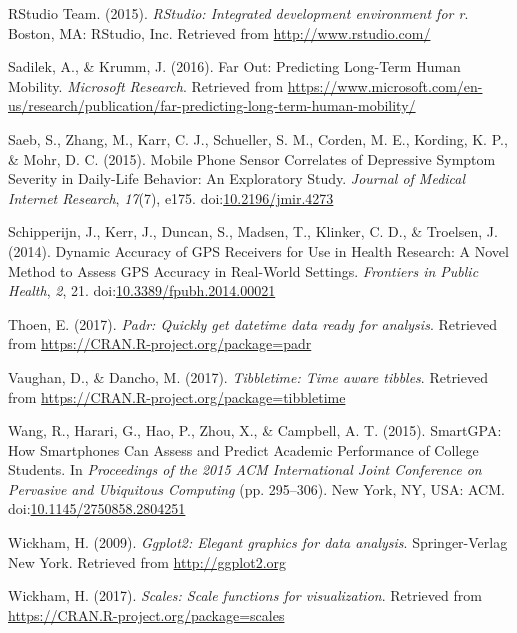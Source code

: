 \documentclass[english,man]{apa6}
\theoremstyle{definition}
\theoremstyle{definition}
\theoremstyle{definition}
\theoremstyle{remark}
\begin{document}
\hypertarget{ref-rstudio}{}
RStudio Team. (2015). \emph{RStudio: Integrated development environment
for r}. Boston, MA: RStudio, Inc. Retrieved from
\url{http://www.rstudio.com/}

\hypertarget{ref-sadilek_far_2016}{}
Sadilek, A., \& Krumm, J. (2016). Far Out: Predicting Long-Term Human
Mobility. \emph{Microsoft Research}. Retrieved from
\url{https://www.microsoft.com/en-us/research/publication/far-predicting-long-term-human-mobility/}

\hypertarget{ref-saeb_mobile_2015}{}
Saeb, S., Zhang, M., Karr, C. J., Schueller, S. M., Corden, M. E.,
Kording, K. P., \& Mohr, D. C. (2015). Mobile Phone Sensor Correlates of
Depressive Symptom Severity in Daily-Life Behavior: An Exploratory
Study. \emph{Journal of Medical Internet Research}, \emph{17}(7), e175.
doi:\href{https://doi.org/10.2196/jmir.4273}{10.2196/jmir.4273}

\hypertarget{ref-schipperijn_dynamic_2014}{}
Schipperijn, J., Kerr, J., Duncan, S., Madsen, T., Klinker, C. D., \&
Troelsen, J. (2014). Dynamic Accuracy of GPS Receivers for Use in Health
Research: A Novel Method to Assess GPS Accuracy in Real-World Settings.
\emph{Frontiers in Public Health}, \emph{2}, 21.
doi:\href{https://doi.org/10.3389/fpubh.2014.00021}{10.3389/fpubh.2014.00021}

\hypertarget{ref-padr}{}
Thoen, E. (2017). \emph{Padr: Quickly get datetime data ready for
analysis}. Retrieved from \url{https://CRAN.R-project.org/package=padr}

\hypertarget{ref-tibbletime}{}
Vaughan, D., \& Dancho, M. (2017). \emph{Tibbletime: Time aware
tibbles}. Retrieved from
\url{https://CRAN.R-project.org/package=tibbletime}

\hypertarget{ref-wang_smartgpa:_2015}{}
Wang, R., Harari, G., Hao, P., Zhou, X., \& Campbell, A. T. (2015).
SmartGPA: How Smartphones Can Assess and Predict Academic Performance of
College Students. In \emph{Proceedings of the 2015 ACM International
Joint Conference on Pervasive and Ubiquitous Computing} (pp. 295--306).
New York, NY, USA: ACM.
doi:\href{https://doi.org/10.1145/2750858.2804251}{10.1145/2750858.2804251}

\hypertarget{ref-ggplot2}{}
Wickham, H. (2009). \emph{Ggplot2: Elegant graphics for data analysis}.
Springer-Verlag New York. Retrieved from \url{http://ggplot2.org}

\hypertarget{ref-scales}{}
Wickham, H. (2017). \emph{Scales: Scale functions for visualization}.
Retrieved from \url{https://CRAN.R-project.org/package=scales}
\end{document}
